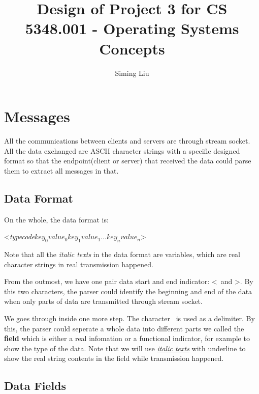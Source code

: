 \documentclass[a4paper]{report}
\begin{document}
\title{Design of Project 3 for CS 5348.001 - Operating Systems Concepts}

\author{Siming Liu}

\maketitle{}

\section*{Messages}
All the communications between clients and servers are through stream socket. All the data exchanged are ASCII character strings with a specific designed format so that the endpoint(client or server) that received the data could parse them to extract all messages in that.

\subsection*{Data Format}

On the whole, the data format is:

\vspace{1em}

\centerline{\textless\textbar\textit{type}\textbar\textit{code}\textbar${key}_{0}$\textbar${value}_{0}$\textbar${key}_{1}$\textbar${value}_{1}$\textbar$\ldots$\textbar${key}_{n}$\textbar${value}_{n}$\textbar\textgreater}

\noindent Note that all the \textit{italic texts} in the data format are variables, which are real character strings in real transmission happened.

\noindent From the outmost, we have one pair data start and end indicator: \textless \ and \textgreater. By this two characters, the parser could identify the beginning and end of the data when only parts of data are transmitted through stream socket.

\noindent We goes through inside one more step. The character \textbar \ is used as a delimiter. By this, the parser could seperate a whole data into different parts we called the \textbf{field} which is either a real infomation or a functional indicator, for example to show the type of the data. Note that we will use \underline{\textit{italic texts}} with underline to show the real string contents in the field while transmission happened.

\subsection*{Data Fields}
\end{document}
